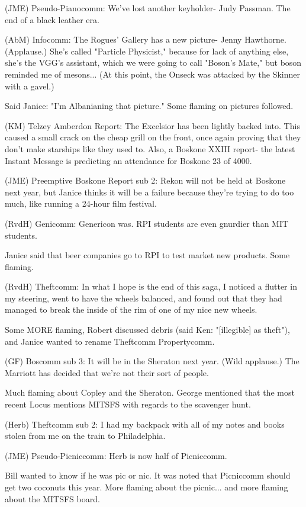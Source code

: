 \documentclass[12pt]{article}
\begin{document}
(JME) Pseudo-Pianocomm: We've lost another keyholder- Judy Passman. The end of a black leather era.

(AbM) Infocomm: The Rogues' Gallery has a new picture- Jenny Hawthorne. (Applause.) She's called "Particle Physicist," because for lack of anything else, she's the VGG's assistant, which we were going to call "Boson's Mate," but boson reminded me of mesons... (At this point, the Onseck was attacked by the Skinner with a gavel.)

Said Janice: "I'm Albanianing that picture." Some flaming on pictures followed.

(KM) Telzey Amberdon Report: The Excelsior has been lightly backed into. This caused a small crack on the cheap grill on the front, once again proving that they don't make starships like they used to. Also, a Boskone XXIII report- the latest Instant Message is predicting an attendance for Boskone 23 of 4000.

(JME) Preemptive Boskone Report sub 2: Rekon will not be held at Boskone next year, but Janice thinks it will be a failure because they're trying to do too much, like running a 24-hour film festival.

(RvdH) Genicomm: Genericon was. RPI students are even gnurdier than MIT students.

Janice said that beer companies go to RPI to test market new products. Some flaming.

(RvdH) Theftcomm: In what I hope is the end of this saga, I noticed a flutter in my steering, went to have the wheels balanced, and found out that they had managed to break the inside of the rim of one of my nice new wheels.

Some MORE flaming, Robert discussed debris (said Ken: "[illegible] as theft"), and Janice wanted to rename Theftcomm Propertycomm.

(GF) Boscomm sub 3: It will be in the Sheraton next year. (Wild applause.) The Marriott has decided that we're not their sort of people.

Much flaming about Copley and the Sheraton. George mentioned that the most recent Locus mentions MITSFS with regards to the scavenger hunt.

(Herb) Theftcomm sub 2: I had my backpack with all of my notes and books stolen from me on the train to Philadelphia. 

(JME) Pseudo-Picniccomm: Herb is now half of Picniccomm.

Bill wanted to know if he was pic or nic. It was noted that Picniccomm should get two coconuts this year. More flaming about the picnic... and more flaming about the MITSFS board.
\end{document}
